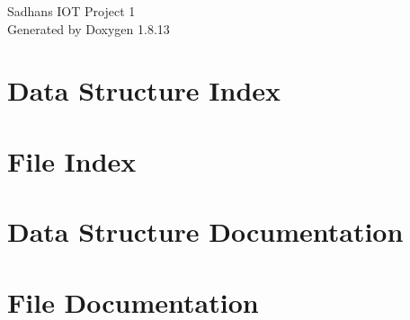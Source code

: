 \documentclass[twoside]{book}
\newcommand{\+}{\discretionary{\mbox{\scriptsize$\hookleftarrow$}}{}{}}
\newcommand{\clearemptydoublepage}{%
  \newpage{\pagestyle{empty}\cleardoublepage}%
}
\begin{document}
\hypersetup{pageanchor=false,
             bookmarksnumbered=true,
             pdfencoding=unicode
            }
\begin{titlepage}
\vspace*{7cm}
\begin{center}%
{\Large Sadhan\textquotesingle{}s I\+OT Project 1 }\\
\vspace*{1cm}
{\large Generated by Doxygen 1.8.13}\\
\end{center}
\end{titlepage}
\clearemptydoublepage
{}
\tableofcontents
\clearemptydoublepage
{}
\hypersetup{pageanchor=true}

\chapter{Data Structure Index}

\chapter{File Index}

\chapter{Data Structure Documentation}













\chapter{File Documentation}




















































\backmatter
\newpage
{}
\clearemptydoublepage
{}
\printindex
\end{document}
